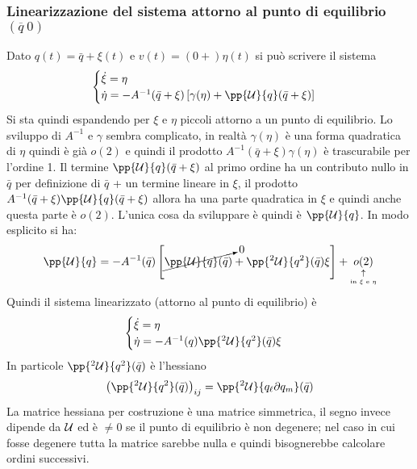 \documentclass[Main.tex]{subfiles}
\begin{document}
\subsubsection{Linearizzazione del sistema attorno al punto di equilibrio $(\overline q  \ 0 )$}
Dato $q(t) = \bar q + \xi(t)$ e $v(t) = (0+) \eta (t)$ si può scrivere il sistema
\begin{gather}
	\begin{cases}
		\dot \xi = \eta \\
		\dot \eta = -A^{-1} ( \bar q + \xi ) \left[\gamma(\eta) + \pp{\U}{q} ( \bar q + \xi) \right]
	\end{cases}
\end{gather}
Si sta quindi espandendo per $\xi$ e $\eta$ piccoli attorno a un punto di equilibrio. Lo sviluppo di $A^{-1}$ e $\gamma$ sembra complicato, in realtà $\gamma (\eta)$ è una forma quadratica di $\eta$ quindi è già $o(2)$ e quindi il prodotto $A^{-1} ( \bar q + \xi ) \gamma(\eta)$ è trascurabile per l'ordine 1. Il termine $\pp{\U}{q} ( \bar q + \xi)$ al primo ordine ha un contributo nullo in $\bar q$ per definizione di $\bar q$ + un termine lineare in $\xi$, il prodotto $A^{-1} ( \bar q + \xi )\pp{\U}{q} ( \bar q + \xi)$ allora ha una parte quadratica in $\xi$ e quindi anche questa parte è $o(2)$. L'unica cosa da sviluppare è quindi è $\pp{\U}{q}$. In modo esplicito si ha:
\begin{gather}
	\pp{\U}{q}= -A^{-1} (\bar q) \left[ \cancelto{0}{\pp{\U}{q} (\bar q)} +\pp{^2 \U}{q^2}(\bar q) \xi \right] + \underset{\underset{\text{in $\xi$ e $\eta$}}{\uparrow}}{o(2)}
\end{gather}
Quindi il sistema linearizzato (attorno al punto di equilibrio) è 
\begin{equation}
	\begin{cases}
		\dot \xi = \eta \\
		\dot \eta = -A^{-1}(q) \pp{^2 \U}{q^2}(\bar q) \xi 
	\end{cases}
\end{equation}
In particole $\pp{^2 \U}{q^2}(\bar q)$ è l'hessiano 
\begin{equation}
	\left( \pp{^2 \U}{q^2}(\bar q) \right)_{ij} = \pp{^2 \U }{q_\ell \partial q_m} (\bar q) 
\end{equation}
La matrice hessiana per costruzione è una matrice simmetrica, il segno invece dipende da $\mathcal{U}$ ed è $\neq 0$ se il punto di equilibrio è non degenere; nel caso in cui fosse degenere tutta la matrice sarebbe nulla e quindi bisognerebbe calcolare ordini successivi. 
\end{document}
